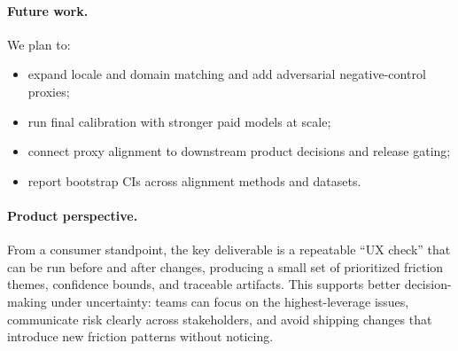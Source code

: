 \paragraph{Future work.}
We plan to:
\begin{itemize}
    \item expand locale and domain matching and add adversarial negative-control proxies;
    \item run final calibration with stronger paid models at scale;
    \item connect proxy alignment to downstream product decisions and release gating;
    \item report bootstrap CIs across alignment methods and datasets.
\end{itemize}

\paragraph{Product perspective.}
From a consumer standpoint, the key deliverable is a repeatable ``UX check'' that can be run before and after changes,
producing a small set of prioritized friction themes, confidence bounds, and traceable artifacts.
This supports better decision-making under uncertainty: teams can focus on the highest-leverage issues, communicate
risk clearly across stakeholders, and avoid shipping changes that introduce new friction patterns without noticing.

